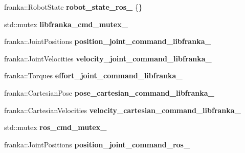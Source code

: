 \begin{DoxyCompactItemize}
\mbox{\label{classfranka__hw_1_1_franka_h_w_aa87c69ba0fb5281e2bbe1ad819fb02b5}} 
franka\+::\+Robot\+State {\bfseries robot\+\_\+state\+\_\+ros\+\_\+} \{\}
\item 
\mbox{\label{classfranka__hw_1_1_franka_h_w_a01434e76a69afa29f009de2aacd5a0c0}} 
std\+::mutex {\bfseries libfranka\+\_\+cmd\+\_\+mutex\+\_\+}
\item 
\mbox{\label{classfranka__hw_1_1_franka_h_w_a7fe1fb5677162020a5a68dbf33dcf2a8}} 
franka\+::\+Joint\+Positions {\bfseries position\+\_\+joint\+\_\+command\+\_\+libfranka\+\_\+}
\item 
\mbox{\label{classfranka__hw_1_1_franka_h_w_a97615d220402aec7723b2a0edeb52043}} 
franka\+::\+Joint\+Velocities {\bfseries velocity\+\_\+joint\+\_\+command\+\_\+libfranka\+\_\+}
\item 
\mbox{\label{classfranka__hw_1_1_franka_h_w_ab481fa379d12af7339a2fc84a5351090}} 
franka\+::\+Torques {\bfseries effort\+\_\+joint\+\_\+command\+\_\+libfranka\+\_\+}
\item 
\mbox{\label{classfranka__hw_1_1_franka_h_w_a4bcf6ae0cb54478065f7bdb4cebc3684}} 
franka\+::\+Cartesian\+Pose {\bfseries pose\+\_\+cartesian\+\_\+command\+\_\+libfranka\+\_\+}
\item 
\mbox{\label{classfranka__hw_1_1_franka_h_w_a000ca0dd3d505f095fa9ee17967b7563}} 
franka\+::\+Cartesian\+Velocities {\bfseries velocity\+\_\+cartesian\+\_\+command\+\_\+libfranka\+\_\+}
\item 
\mbox{\label{classfranka__hw_1_1_franka_h_w_aa23bd816eecbd232ca2df39dc5e3f8b4}} 
std\+::mutex {\bfseries ros\+\_\+cmd\+\_\+mutex\+\_\+}
\item 
\mbox{\label{classfranka__hw_1_1_franka_h_w_a1d65810b55198d9691b25bf3c6ecbc00}} 
franka\+::\+Joint\+Positions {\bfseries position\+\_\+joint\+\_\+command\+\_\+ros\+\_\+}
\item 

\end{DoxyCompactItemize}

